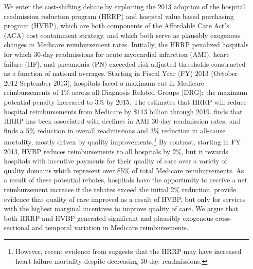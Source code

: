 \documentclass[12pt]{article}
\begin{document}
We enter the cost-shifting debate by exploiting the 2013 adoption of the hospital readmission reduction program (HRRP) and hospital value based purchasing program (HVBP), which are both components of the Affordable Care Act's (ACA) cost containment strategy, and which both serve as plausibly exogenous changes in Medicare reimbursement rates.  Initially, the HRRP penalized hospitals for which 30-day readmissions for acute myocardial infarction (AMI), heart failure (HF), and pneumonia (PN) exceeded risk-adjusted thresholds constructed as a function of national averages.  Starting in Fiscal Year (FY) 2013 (October 2012-September 2013), hospitals faced a maximum cut in Medicare reimbursements of 1$\%$ across all Diagnosis Related Groups (DRG); the maximum potential penalty increased to 3$\%$ by 2015.  The \cite{cbo2010} estimates that HRRP will reduce hospital reimbursements from Medicare by $\$$113 billion through 2019.  \citet{mellor2016} finds that HRRP has been associated with declines in AMI 30-day readmission rates, and \citet{gupta2016} finds a 5$\%$ reduction in overall readmissions and 3$\%$ reduction in all-cause mortality, mostly driven by quality improvements.\footnote{However, recent evidence from \citet{gupta2017} suggests that the HRRP may have increased heart failure mortality despite decreasing 30-day readmissions.}  By contrast, starting in FY 2013, HVBP reduces reimbursements to all hospitals by 2$\%$, but it rewards hospitals with incentive payments for their quality of care over a variety of quality domains which represent over 85$\%$ of total Medicare reimbursements.  As a result of these potential rebates, hospitals have the opportunity to receive a net reimbursement increase if the rebates exceed the initial 2$\%$ reduction.  \citet{norton2016} provide evidence that quality of care improved as a result of HVBP, but only for services with the highest marginal incentives to improve quality of care.  We argue that both HRRP and HVBP generated significant and plausibly exogenous cross-sectional and temporal variation in Medicare reimbursements.  
\end{document}
